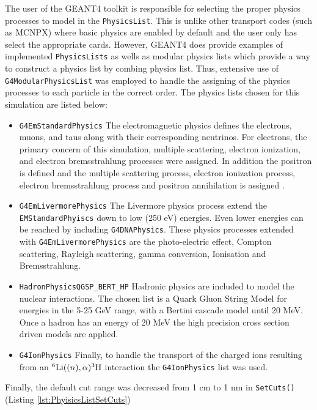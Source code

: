 The user of the GEANT4 toolkit is responsible for selecting the proper physics processes to model in the \verb+PhysicsList+.
This is unlike other transport codes (such as MCNPX) where basic physics are enabled by default and the user only has select the appropriate cards.
However, GEANT4 does provide examples of implemented \verb+PhysicsLists+ as wells as modular physics lists which provide a way to construct a physics list by combing physics list.
Thus, extensive use of \verb+G4ModularPhysicsList+ was employed to handle the assigning of the physics processes to each particle in the correct order.
The physics lists chosen for this simulation are listed below:
\begin{itemize}
    \item \verb+G4EmStandardPhysics+ The electromagnetic physics defines the electrons, muons, and taus along with their corresponding neutrinos. For electrons, the primary concern of this simulation, multiple scattering, electron ionization, and electron bremsstrahlung processes were assigned.  In addition the positron is defined and the multiple scattering process, electron ionization process, electron bremsstrahlung process and positron annihilation is assigned \cite{cern_physics_2012}.
    \item \verb+G4EmLivermorePhysics+ The Livermore physics process extend the \verb+EMStandardPhyiscs+ down to low (250 eV) energies. Even lower energies can be reached by including \verb+G4DNAPhysics+. These physics processes extended with \verb+G4EmLivermorePhysics+ are the photo-electric effect, Compton scattering, Rayleigh scattering, gamma conversion, Ionisation and Bremsstrahlung\cite{cern_physics_2012}. 
    \item \verb+HadronPhysicsQGSP_BERT_HP+ Hadronic physics are included to model the nuclear interactions. The chosen list is a Quark Gluon String Model for energies in the 5-25 GeV range, with a Bertini cascade model until 20 MeV.  Once a hadron has an energy of 20 MeV the high precision cross section driven models are applied\cite{cern_reference_2008}.
    \item \verb+G4IonPhysics+ Finally, to handle the transport of the charged ions resulting from an ${}^6\text{Li}(\text(n),\alpha){}^{3}\text{H}$ interaction the \verb+G4IonPhysics+ list was used.
\end{itemize}

Finally, the default cut range was decreased from 1 cm to 1 nm in \verb+SetCuts()+ (Listing \ref{lst:PhyisicsListSetCuts}) 

